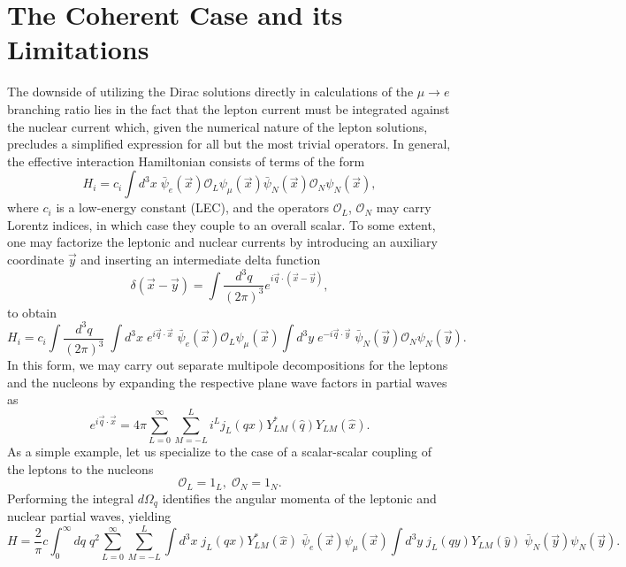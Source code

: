 \documentclass{book}[letterpaper,12pt]
\begin{document}
\section{The Coherent Case and its Limitations}
The downside of utilizing the Dirac solutions directly in calculations of the $\mu\rightarrow e$ branching ratio lies in the fact that the lepton current must be integrated against the nuclear current which, given the numerical nature of the lepton solutions, precludes a simplified expression for all but the most trivial operators. In general, the effective interaction Hamiltonian consists of terms of the form
\begin{equation}
H_i= c_i \int d^3 x \;\bar{\psi}_e(\vec{x})\mathcal{O}_L\psi_{\mu}(\vec{x})\bar{\psi}_N(\vec{x})\mathcal{O}_N\psi_N(\vec{x}),
\end{equation}
where $c_i$ is a low-energy constant (LEC), and the operators $\mathcal{O}_L$, $\mathcal{O}_N$ may carry Lorentz indices, in which case they couple to an overall scalar. To some extent, one may factorize the leptonic and nuclear currents by introducing an auxiliary  coordinate $\vec{y}$ and inserting an intermediate delta function
\begin{equation}
\delta(\vec{x}-\vec{y})=\int \frac{d^3q}{(2\pi)^3}e^{i\vec{q}\cdot(\vec{x}-\vec{y})},
\end{equation}
to obtain
\begin{equation}
H_i=c_i\int \frac{d^3q}{(2\pi)^3}\;\int d^3x\;e^{i\vec{q}\cdot\vec{x}}\;\bar{\psi}_e(\vec{x})\mathcal{O}_L\psi_\mu(\vec{x})\int d^3y\;e^{-i\vec{q}\cdot\vec{y}}\;\bar{\psi}_N(\vec{y})\mathcal{O}_N\psi_N(\vec{y}).
\end{equation}
In this form, we may carry out separate multipole decompositions for the leptons and the nucleons by expanding the respective plane wave factors in partial waves as
\begin{equation}
e^{i\vec{q}\cdot\vec{x}}=4\pi\sum_{L=0}^{\infty}\sum_{M=-L}^Li^Lj_L(qx)Y_{LM}^*(\hat{q})Y_{LM}(\hat{x}).
\end{equation}
As a simple example, let us specialize to the case of a scalar-scalar coupling of the leptons to the nucleons 
\begin{equation}
\mathcal{O}_L=1_L,\;\mathcal{O}_N=1_N.
\end{equation}
Performing the integral $d\Omega_q$ identifies the angular momenta of the leptonic and nuclear partial waves, yielding
\begin{equation}
H=\frac{2}{\pi}c\int_0^{\infty}dq\;q^2 \sum_{L=0}^{\infty}\sum_{M=-L}^L\int d^3x\;j_L(qx)Y^*_{LM}(\hat{x})\;\bar{\psi}_e(\vec{x})\psi_{\mu}(\vec{x})\int d^3y\;j_L(qy)Y_{LM}(\hat{y})\;\bar{\psi}_N(\vec{y})\psi_N(\vec{y}).
\label{eq:H_full_multi}
\end{equation}
\end{document}

